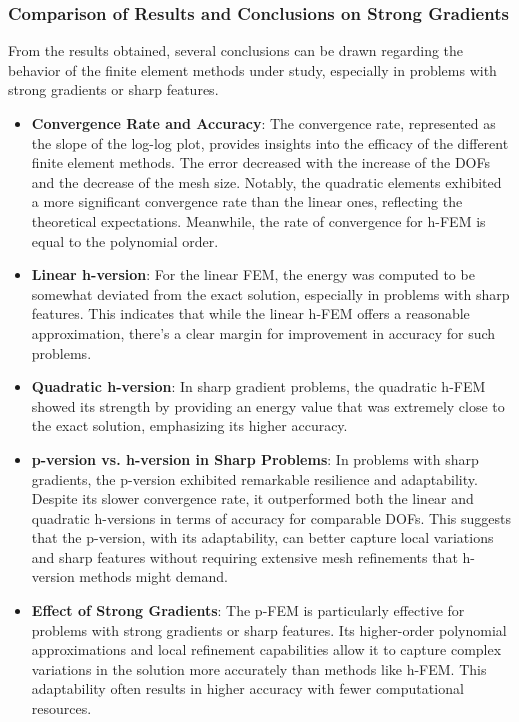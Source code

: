 \documentclass[twoside,twocolumn,10pt]{article}
\begin{document}
\subsubsection{Comparison of Results and Conclusions on Strong Gradients}
From the results obtained, several conclusions can be drawn regarding the behavior of the finite element methods under study, especially in problems with strong gradients or sharp features.

\begin{itemize}
    \item \textbf{Convergence Rate and Accuracy}: The convergence rate, represented as the slope of the log-log plot, provides insights into the efficacy of the different finite element methods. The error decreased with the increase of the DOFs and the decrease of the mesh size. Notably, the quadratic elements exhibited a more significant convergence rate than the linear ones, reflecting the theoretical expectations. Meanwhile, the rate of convergence for h-FEM is equal to the polynomial order.
    
    \item \textbf{Linear h-version}: For the linear FEM, the energy was computed to be somewhat deviated from the exact solution, especially in problems with sharp features. This indicates that while the linear h-FEM offers a reasonable approximation, there's a clear margin for improvement in accuracy for such problems.
    
    \item \textbf{Quadratic h-version}: In sharp gradient problems, the quadratic h-FEM showed its strength by providing an energy value that was extremely close to the exact solution, emphasizing its higher accuracy.
    
    \item \textbf{p-version vs. h-version in Sharp Problems}: In problems with sharp gradients, the p-version exhibited remarkable resilience and adaptability. Despite its slower convergence rate, it outperformed both the linear and quadratic h-versions in terms of accuracy for comparable DOFs. This suggests that the p-version, with its adaptability, can better capture local variations and sharp features without requiring extensive mesh refinements that h-version methods might demand.
    
    \item \textbf{Effect of Strong Gradients}: The p-FEM is particularly effective for problems with strong gradients or sharp features. Its higher-order polynomial approximations and local refinement capabilities allow it to capture complex variations in the solution more accurately than methods like h-FEM. This adaptability often results in higher accuracy with fewer computational resources.


\end{itemize}
\end{document}

